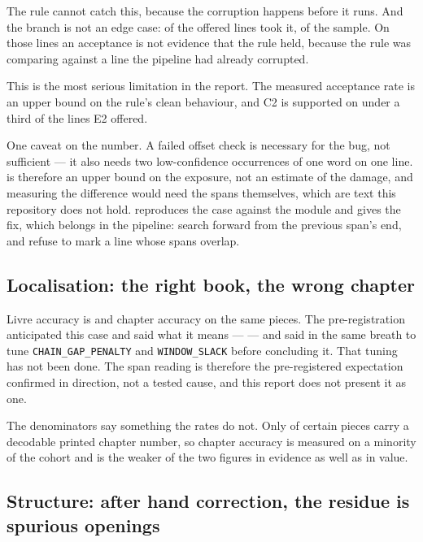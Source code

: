 The rule cannot catch this, because the corruption happens before it runs. And
the branch is not an edge case: \corrOnFindFallback{} of the \corrOffered{}
offered lines took it, \corrFindFallbackShare{} of the sample. On those lines
an acceptance is not evidence that the rule held, because the rule was
comparing against a line the pipeline had already corrupted.

This is the most serious limitation in the report. The measured acceptance rate
is an upper bound on the rule's clean behaviour, and C2 is supported on under a
third of the lines E2 offered.

One caveat on the number. A failed offset check is necessary for the bug, not
sufficient --- it also needs two low-confidence occurrences of one word on one
line. \corrFindFallbackShare{} is therefore an upper bound on the exposure, not
an estimate of the damage, and measuring the difference would need the spans
themselves, which are text this repository does not hold.
 reproduces the case
against the module and gives the fix, which belongs in the pipeline: search
forward from the previous span's end, and refuse to mark a line whose spans
overlap.

\subsection{Localisation: the right book, the wrong chapter}

Livre accuracy is \locLivreAccuracyWorkbook{} and chapter accuracy
\locChapterAccuracyWorkbook{} on the same pieces. The pre-registration
anticipated this case and said what it means ---  --- and said in the same
breath to tune \texttt{CHAIN\_GAP\_PENALTY} and \texttt{WINDOW\_SLACK} before
concluding it. That tuning has not been done. The span reading is therefore the
pre-registered expectation confirmed in direction, not a tested cause, and this
report does not present it as one.

The denominators say something the rates do not. Only
\locChapterScoreableWorkbook{} of \locPiecesWorkbook{} certain pieces carry a
decodable printed chapter number, so chapter accuracy is measured on a minority
of the cohort and is the weaker of the two figures in evidence as well as in
value.

\subsection{Structure: after hand correction, the residue is spurious openings}

